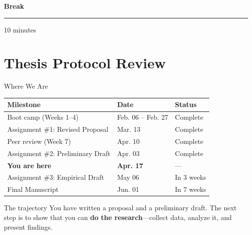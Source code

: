 \documentclass[aspectratio=169,11pt]{beamer}
\begin{document}
\begin{frame}
    \vspace{2.5cm}
    \begin{center}
        {\color{AccentBlue}\Huge\bfseries Break}
        \vspace{0.3cm}

        {\color{DustyRose}\rule{3cm}{0.8pt}}
        \vspace{0.5cm}

        {\color{TextMuted}\large 10 minutes}
    \end{center}
\end{frame}

\section{Thesis Protocol Review}

\begin{frame}{Where We Are}
    \begin{table}
        \small
        \begin{tabular}{lll}
            \toprule
            \textbf{Milestone} & \textbf{Date} & \textbf{Status} \\
            \midrule
            Boot camp (Weeks 1--4) & Feb. 06 -- Feb. 27 & \textcolor{SageGreen}{Complete} \\
            Assignment \#1: Revised Proposal & Mar. 13 & \textcolor{SageGreen}{Complete} \\
            Peer review (Week 7) & Apr. 10 & \textcolor{SageGreen}{Complete} \\
            Assignment \#2: Preliminary Draft & Apr. 03 & \textcolor{SageGreen}{Complete} \\
            \textbf{You are here} & \textbf{Apr. 17} & --- \\
            Assignment \#3: Empirical Draft & May 06 & \textcolor{Terracotta}{In 3 weeks} \\
            Final Manuscript & Jun. 01 & \textcolor{Terracotta}{In 7 weeks} \\
            \bottomrule
        \end{tabular}
    \end{table}
    \vspace{0.3cm}
    \begin{alertblock}{The trajectory}
        You have written a proposal and a preliminary draft. The next step is to show that you can \textbf{do the research}---collect data, analyze it, and present findings.
    \end{alertblock}
\end{frame}
\end{document}
